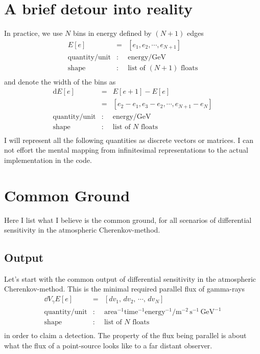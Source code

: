 \documentclass{article}%
\begin{document}
    \section{A brief detour into reality}
        In practice, we use $N$ bins in energy defined by $(N+1)$ edges
        \begin{eqnarray*}
            E[e] &=& [e_1, e_2, \cdots, e_{N+1}]\\
            \text{quantity}/\text{unit} &:& \text{energy} / \text{GeV}\\
            \text{shape} &:& \text{list of}\,\,(N + 1)\,\,\text{floats}\\
        \end{eqnarray*}
        and denote the width of the bins as
        \begin{eqnarray*}
            \text{d}E[e] &=& E[e+1] - E[e]\\
            &=& [e_2-e_1, e_3-e_2, \cdots, e_{N+1}-e_N]\\
            \text{quantity}/\text{unit} &:& \text{energy} / \text{GeV}\\
            \text{shape} &:& \text{list of}\,\,N\,\,\text{floats}\\
        \end{eqnarray*}
        I will represent all the following quantities as discrete vectors or matrices.
        I can not effort the mental mapping from infinitesimal representations to the actual implementation in the code.
    \section{Common Ground}
        \label{SecCommonGround}
        Here I list what I believe is the common ground, for all scenarios of differential sensitivity in the atmospheric Cherenkov-method.
        \subsection{Output}
            Let's start with the common output of differential sensitivity in the atmospheric Cherenkov-method.
            This is the minimal required parallel flux of gamma-rays
            \begin{eqnarray*}
                \dd{V_\gamma}{E}[e] &=& [dv_1, \, dv_2, \, \cdots, \, dv_N]\\
                \text{quantity}/\text{unit} &:& \text{area}^{-1} \text{time}^{-1} \text{energy}^{-1} / \text{m}^{-2}\,\text{s}^{-1}\,\text{GeV}^{-1}\\
                \text{shape} &:& \text{list of}\,\,N\,\,\text{floats}\\
            \end{eqnarray*}
            in order to claim a detection.
            The property of the flux being parallel is about what the flux of a point-source looks like to a far distant observer.
\end{document}
